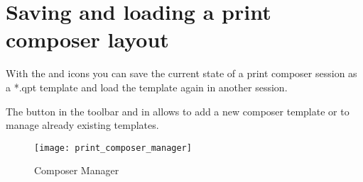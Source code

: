 \section{Saving and loading a print composer layout}

With the  and
 icons you can save the current
state of a print composer session as a  *.qpt template and load the template
again in another session.

The   button in the
toolbar and in  \arrow
{} allows to
add a new composer template or to manage already existing templates.

\begin{figure}[h]
   \centering
   \texttt{[image: print\_composer\_manager]}
   \caption{Composer Manager \nixcaption}
   \label{fig:print_composer_manager}
\end{figure}

\FloatBarrier
